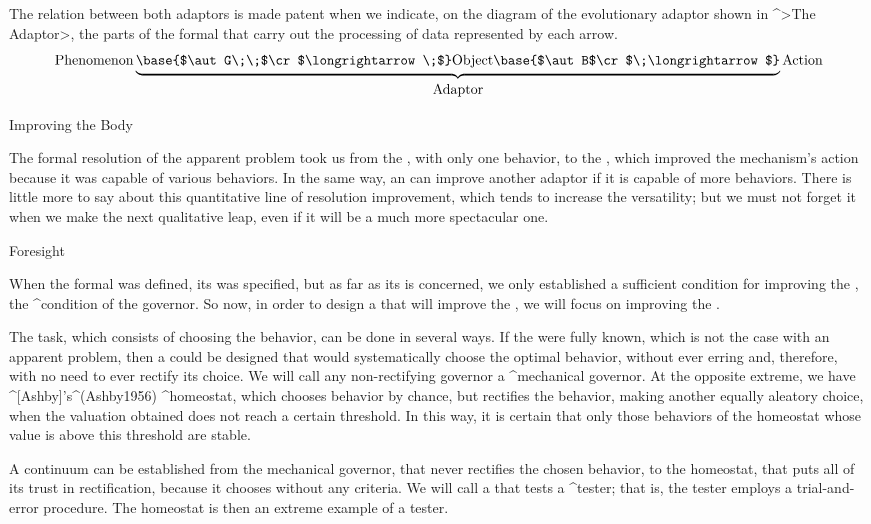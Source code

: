 \hbox{}\hbox{}\break

The relation between both adaptors is made patent when we indicate, on
the diagram of the evolutionary adaptor shown in ^>The Adaptor>, the
parts of the formal {\adaptor} that carry out the processing of data
represented by each arrow.
$$\hbox{Phenomenon}
  \underbrace{
   \base{$\aut G\;\;$\cr$\longrightarrow\;$}
   \hbox{\strut Object}
   \base{$\aut B$\cr$\;\longrightarrow$}}_{\hbox{\strut Adaptor}}
  \hbox{Action}
$$


\Section Improving the Body

The formal resolution of the apparent problem took us from the
{\mechanism}, with only one behavior, to the {\adaptor}, which improved
the mechanism's action because it was capable of various behaviors. In
the same way, an {\adaptor} can improve another adaptor if it is capable
of more behaviors. There is little more to say about this quantitative
line of resolution improvement, which tends to increase the {\bodys}
versatility; but we must not forget it when we make the next qualitative
leap, even if it will be a much more spectacular one.


\Section Foresight

When the formal {\adaptor} was defined, its {\body} was specified, but
as far as its {\governor} is concerned, we only established a sufficient
condition for improving the {\mechanism}, the ^{condition of the
governor}. So now, in order to design a {\learner} that will improve the
{\adaptor}, we will focus on improving the {\governor}.

The {\governors} task, which consists of choosing the {\bodys} behavior,
can be done in several ways. If the {\universe} were fully known, which
is not the case with an apparent problem, then a {\governor} could be
designed that would systematically choose the optimal behavior, without
ever erring and, therefore, with no need to ever rectify its choice. We
will call any non-rectifying governor a ^{mechanical governor}. At the
opposite extreme, we have ^[Ashby]'s^(Ashby1956) ^{homeostat}, which
chooses behavior by chance, but rectifies the behavior, making another
equally aleatory choice, when the valuation obtained does not reach a
certain threshold. In this way, it is certain that only those behaviors
of the homeostat whose value is above this threshold are stable.

A continuum can be established from the mechanical governor, that never
rectifies the chosen behavior, to the homeostat, that puts all of its
trust in rectification, because it chooses without any criteria. We will
call a {\governor} that tests a ^{tester}; that is, the tester employs a
trial-and-error procedure. The homeostat is then an extreme example of a
tester.


